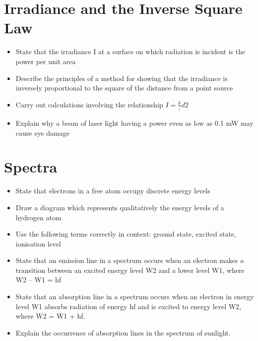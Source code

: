 \section{Irradiance and the Inverse Square Law}
\begin{multicols}{2}
	\begin{itemize}
        \item State that the irradiance I at a surface on which radiation is incident is
            the power per unit area
        \item Describe the principles of a method for showing that the irradiance is
            inversely proportional to the square of the distance from a point source
        \item Carry out calculations involving the relationship $I = \frac{k}/{d2}$
        \item Explain why a beam of laser light having a power even as low as 0.1
            mW may cause eye damage
	\end{itemize}
\end{multicols}

\section{Spectra}
\begin{multicols}{2}
	\begin{itemize}
        \item State that electrons in a free atom occupy discrete energy levels
        \item Draw a diagram which represents qualitatively the energy levels of a
            hydrogen atom
        \item  Use the following terms correctly in context: ground state, excited
            state, ionisation level
        \item State that an emission line in a spectrum occurs when an electron
            makes a transition between an excited energy level W2 and a lower
            level W1, where W2 – W1 = hf
        \item State that an absorption line in a spectrum occurs when an electron in
            energy level W1 absorbs radiation of energy hf and is excited to
            energy level W2, where W2 = W1 + hf.
        \item Explain the occurrence of absorption lines in the spectrum of
            sunlight.
	\end{itemize}
\end{multicols}
